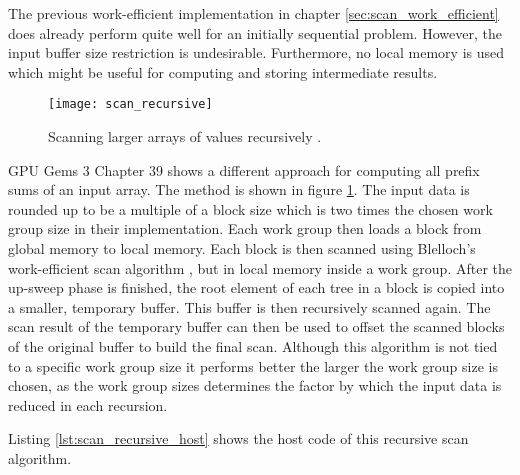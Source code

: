 The previous work-efficient implementation in chapter \ref{sec:scan_work_efficient} does already perform quite well for an initially sequential problem. However, the input buffer size restriction is undesirable. Furthermore, no local memory is used which might be useful for computing and storing intermediate results.

\begin{figure}
\centering
\texttt{[image: scan\_recursive]}
\caption{Scanning larger arrays of values recursively \cite{gpu_gems_3_chapter_39}.}
\label{fig:scan_recursive}
\end{figure}

GPU Gems 3 Chapter 39 \cite{gpu_gems_3_chapter_39} shows a different approach for computing all prefix sums of an input array. The method is shown in figure \ref{fig:scan_recursive}. The input data is rounded up to be a multiple of a block size which is two times the chosen work group size in their implementation. Each work group then loads a block from global memory to local memory. Each block is then scanned using Blelloch's work-efficient scan algorithm \cite{scan_blelloch}, but in local memory inside a work group. After the up-sweep phase is finished, the root element of each tree in a block is copied into a smaller, temporary buffer. This buffer is then recursively scanned again. The scan result of the temporary buffer can then be used to offset the scanned blocks of the original buffer to build the final scan.
Although this algorithm is not tied to a specific work group size it performs better the larger the work group size is chosen, as the work group sizes determines the factor by which the input data is reduced in each recursion.

Listing \ref{lst:scan_recursive_host} shows the host code of this recursive scan algorithm.



